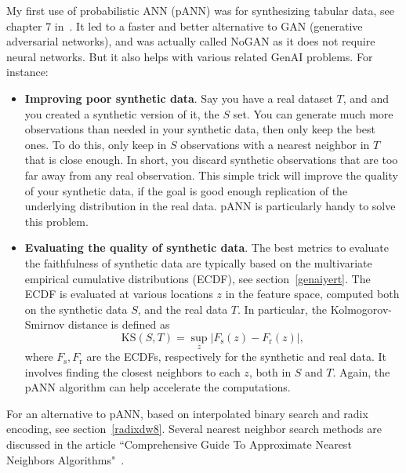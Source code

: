 \documentclass[oneside,10pt]{book}
\begin{document}
My first use of \textcolor{index}{probabilistic ANN} (pANN) was for synthesizing tabular data, see chapter 7 in~\cite{vgmloptim}. 
It led to a faster and better alternative to GAN 
(\textcolor{index}{generative adversarial networks}), and was actually called 
\textcolor{index}{NoGAN} as it does not require neural networks. 
But it also helps with various related GenAI problems. For instance:
\vspace{1ex}
\begin{itemize}
\item {\bf Improving poor synthetic data}. Say you have a real dataset $T$, and and you created a synthetic version of it, the $S$ set. 
You can generate much more observations than needed in your synthetic data, then only keep the best ones. To do this, only keep in 
 $S$ observations with a nearest neighbor in $T$ that is close enough. In short, you discard synthetic observations that are too far  away from any real observation. This simple trick will improve the quality of your synthetic data, if the goal is good enough replication of the underlying distribution in the real data. pANN is particularly handy to solve this problem. \vspace{1ex}

\item {\bf Evaluating the quality of synthetic data}. The best metrics to evaluate the faithfulness of synthetic data are 
 typically based on the
 multivariate \textcolor{index}{empirical cumulative distributions} (ECDF), see section~\ref{genaiyert}.
 The ECDF is evaluated at various locations $z$ in the feature space, computed both on the synthetic
 data $S$, and the real data $T$. In particular, the \textcolor{index}{Kolmogorov-Smirnov distance} is defined as
$$
\text{KS}(S, T)  =\sup_z | F_\text{s}(z)-F_\text{r}(z)|, 
$$
where $F_\text{s}, F_\text{r}$ are the ECDFs, respectively for the synthetic and real data.
It involves finding the closest neighbors to each $z$, both in $S$ and $T$. Again, the pANN algorithm can help accelerate the computations. 
\end{itemize}\vspace{1ex}
\noindent For an alternative to pANN, based on 
 \textcolor{index}{interpolated binary search} and 
\textcolor{index}{radix encoding},  see section~\ref{radixdw8}.
Several nearest neighbor search methods are discussed in the
 article ``Comprehensive Guide To Approximate Nearest Neighbors Algorithms"~\cite{eyal20}. 
\end{document}
